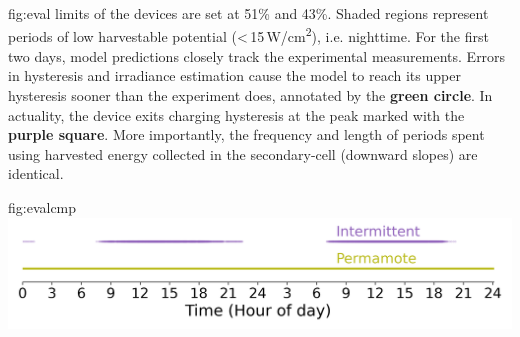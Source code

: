 \begin{definefigure}{fig:eval}
{    limits of the devices are set at 51\% and 43\%. Shaded regions
    represent periods of low harvestable potential
    (<\,15\,\textmu W/cm\textsuperscript{2}),
    i.e. nighttime. For the first two days, model predictions
    closely track the experimental measurements. Errors
    in hysteresis and irradiance estimation cause the model to reach its upper
    hysteresis sooner than the experiment does, annotated by the
    \textbf{\textcolor{fig-green}{green circle}}. In actuality, the device
    exits charging hysteresis at the peak marked with the
    \textbf{\textcolor{fig-purple}{purple square}}.
    More importantly, the
    frequency and length of periods spent using harvested
    energy collected in the secondary-cell (downward slopes) are identical.
    }
\end{definefigure}

\begin{definefigure}{fig:evalcmp}
    \centering
    \includegraphics[width=\linewidth]{figs/capacity/experiment_sys_compare/exp_packets_recv}
    \caption{
      \normalfont
        Packets received over two days.
      This figure compares the reliability of an
      intermittent design and \name. \name sends a packet every second and does
      so without fail, while the intermittent system is only able to send when
      light is available.
      }
\end{definefigure}

